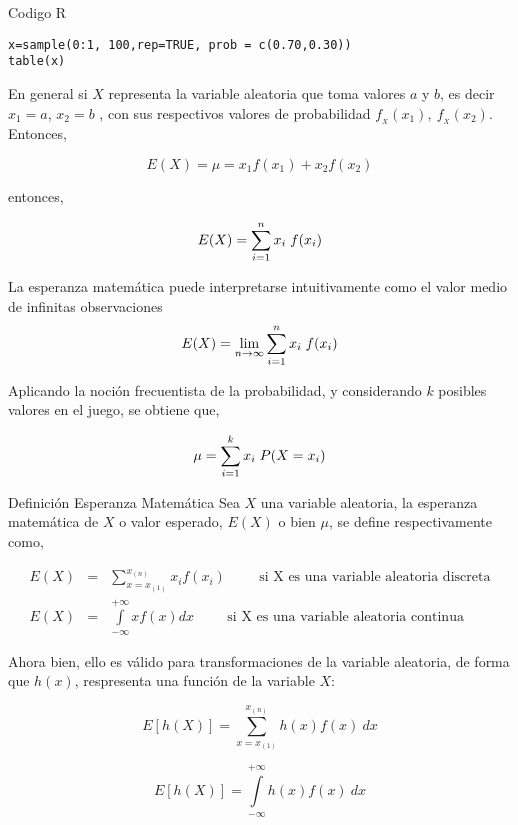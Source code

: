\documentclass[base=hide,12pt]{elegantbook}
\begin{document}
\begin{Box3}{Codigo R}
{\small 	
\begin{verbatim}
x=sample(0:1, 100,rep=TRUE, prob = c(0.70,0.30))
table(x)
\end{verbatim}
}
\end{Box3}



En general si $X$  representa la variable aleatoria  que toma  valores $a$ y $b$,  es decir $x_{1}=a$, $x_{2}=b$ , con sus respectivos valores de probabilidad $f_{_{X}}(x_{1}),\ f_{_{X}}(x_{2})$. Entonces,

\[E(X)=\mu=x_{1}f(x_{1})+x_{2}f(x_{2})\]

entonces,

\[E(X)=\sum\limits_{i=1}^{n}x_{i} \hspace{.1cm}f(x_{i})\]

La esperanza matemática puede interpretarse intuitivamente como el valor medio de infinitas observaciones 
$$E(X)=\lim_{n \rightarrow\infty} \sum\limits_{i=1}^{n}x_{i} \hspace{.1cm} f(x_{i})$$ 

Aplicando la noción frecuentista de la probabilidad, y considerando $k$ posibles  valores en el juego, se obtiene que,

\[\mu=\sum\limits_{i=1}^{k} x_{i}\hspace{.1cm} P(X=x_{i})\]


%
\begin{Box4}{Definición Esperanza Matemática} 
Sea $X$ una variable aleatoria, la esperanza matemática de $X$ o valor esperado, $E(X)$ o bien $\mu$, se define respectivamente como,

\begin{eqnarray*}
	E(X)&=&\sum\limits_{x=x_{(1)}}^{x_{(n)}} x_{i}f(x_{i}) \hspace{1cm} \text{si X es una variable aleatoria discreta} \\
	E(X)&=&\int\limits_{-\infty}^{+\infty}x f(x)dx \hspace{1cm} \text{si X es una variable aleatoria continua} 
\end{eqnarray*}
\end{Box4}
%
Ahora bien, ello es válido para transformaciones de la variable aleatoria, de forma que $h(x)$, respresenta una función de la variable $X$:

\[E[h(X)]=\sum_{x=x_{(1)}}^{x_{(n)}}h(x)f(x)\:dx\]

\[E[h(X)]=\int\limits_{-\infty}^{+\infty}h(x)f(x)\:dx\]
\end{document}
